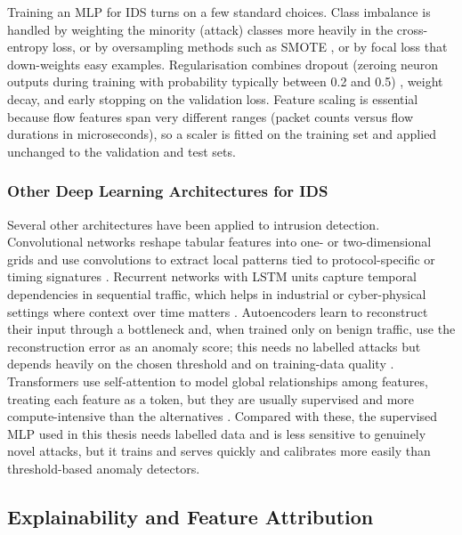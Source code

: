 \par Training an MLP for IDS turns on a few standard choices. Class imbalance is handled by weighting the minority (attack) classes more heavily in the cross-entropy loss, or by oversampling methods such as SMOTE \cite{Chawla2002}, or by focal loss that down-weights easy examples. Regularisation combines dropout (zeroing neuron outputs during training with probability typically between 0.2 and 0.5) \cite{Srivastava2014}, weight decay, and early stopping on the validation loss. Feature scaling is essential because flow features span very different ranges (packet counts versus flow durations in microseconds), so a scaler is fitted on the training set and applied unchanged to the validation and test sets.

\subsubsection{Other Deep Learning Architectures for IDS}
\label{subsec:other_architectures}

\par Several other architectures have been applied to intrusion detection. Convolutional networks reshape tabular features into one- or two-dimensional grids and use convolutions to extract local patterns tied to protocol-specific or timing signatures \cite{Vinayakumar2018}. Recurrent networks with LSTM units capture temporal dependencies in sequential traffic, which helps in industrial or cyber-physical settings where context over time matters \cite{Kim2020}. Autoencoders learn to reconstruct their input through a bottleneck and, when trained only on benign traffic, use the reconstruction error as an anomaly score; this needs no labelled attacks but depends heavily on the chosen threshold and on training-data quality \cite{Mirsky2018}. Transformers use self-attention to model global relationships among features, treating each feature as a token, but they are usually supervised and more compute-intensive than the alternatives \cite{Wu2022}. Compared with these, the supervised MLP used in this thesis needs labelled data and is less sensitive to genuinely novel attacks, but it trains and serves quickly and calibrates more easily than threshold-based anomaly detectors.

\subsection{Explainability and Feature Attribution}
\label{subsec:xai_ids}

